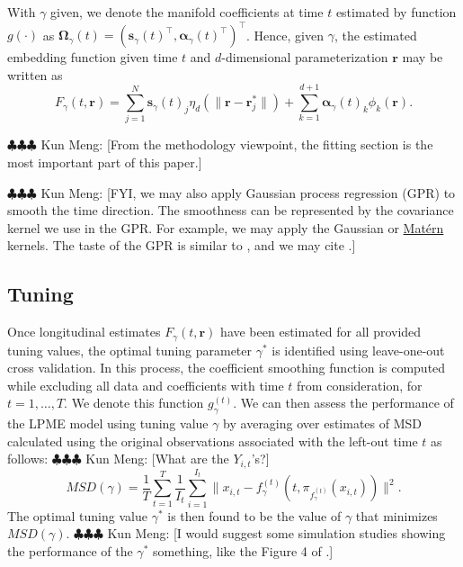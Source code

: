 \documentclass[11pt,reqno]{article}
\newcommand{\T}{\intercal}
\newcommand{\meng}[1]{{\color{purple} \sf $\clubsuit\clubsuit\clubsuit$ Kun Meng: [#1]}}
\theoremstyle{definition}
\begin{document}
With $\gamma$ given, we denote the manifold coefficients at time $t$ estimated by function $g(\cdot)$ as $\boldsymbol{\Omega}_{\gamma}(t) = \left(\boldsymbol{s}_{\gamma}(t)^\T, \boldsymbol{\alpha}_{\gamma}(t)^\T\right)^\T$. Hence, given $\gamma$, the estimated embedding function given time $t$ and $d$-dimensional parameterization $\boldsymbol{r}$ may be written as
\begin{equation}
  F_{\gamma}(t, \boldsymbol{r}) = \sum_{j=1}^{N}\boldsymbol{s}_{\gamma}(t)_j \eta_{d}\left(\|\boldsymbol{r} - \boldsymbol{r}_j^*\|\right) + \sum_{k=1}^{d+1}\boldsymbol{\alpha}_{\gamma}(t)_k \phi_k(\boldsymbol{r}). \label{eq:17}
\end{equation}

\meng{From the methodology viewpoint, the fitting section is the most important part of this paper.}

\meng{FYI, we may also apply Gaussian process regression (GPR) to smooth the time direction. The smoothness can be represented by the covariance kernel we use in the GPR. For example, we may apply the Gaussian or \href{https://en.wikipedia.org/wiki/Matern_covariance_function}{Matérn} kernels. The taste of the GPR is similar to \cite{dunson2021inferring}, and we may cite \cite{dunson2021inferring}.}

\subsection*{Tuning}

Once longitudinal estimates $F_{\gamma}(t, \boldsymbol{r})$ have been estimated for all provided tuning values, the optimal tuning parameter $\gamma^*$ is identified using leave-one-out cross validation. In this process, the coefficient smoothing function is computed while excluding all data and coefficients with time $t$ from consideration, for $t = 1, \dots, T$. We denote this function $g_{\gamma}^{(t)}$. We can then assess the performance of the LPME model using tuning value $\gamma$ by averaging over estimates of MSD calculated using the original observations associated with the left-out time $t$ as follows: \meng{What are the $Y_{i,t}$'s?}
\begin{equation}
  MSD(\gamma) = \frac{1}{T} \sum_{t=1}^{T}\frac{1}{I_t}\sum_{i=1}^{I_t}\|x_{i, t} - f_{\gamma}^{(t)}(t, \pi_{f_{\gamma}^{(t)}}(x_{i, t}))\|^2. \label{eq:18}
\end{equation}
The optimal tuning value $\gamma^*$ is then found to be the value of $\gamma$ that minimizes $MSD(\gamma)$. \meng{I would suggest some simulation studies showing the performance of the $\gamma^*$ something, like the Figure 4 of \cite{mengPrincipalManifoldEstimation2021}.}
\end{document}
